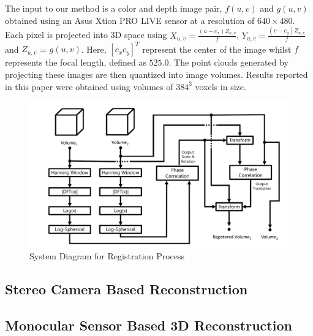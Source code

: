 The input to our method is a color and depth image pair, $f(u,v)$ and $g(u,v)$ obtained using an Asus Xtion PRO LIVE sensor at a resolution of $640 \times 480$. Each pixel is projected into 3D space using $X_{u,v} = \frac{(u - c_x)Z_{u,v}}{f}$, $Y_{u,v} = \frac{(v - c_y)Z_{u,v}}{f}$ and $Z_{u,v}$ = $g(u,v)$. 
Here, $[c_x c_y]^T$ represent the center of the image whilst $f$ represents the focal length, defined as $525.0$. The point clouds generated by projecting these images are then quantized into image volumes. Results reported in this paper were obtained using volumes of $384^3$ voxels in size.
\begin{figure}[t]
\centering
\includegraphics[width=6.0in]{images/ch2/pipeline2}
\caption{System Diagram for Registration Process}
\label{fig:PIPELINE}
\end{figure}


\subsection{Stereo Camera Based Reconstruction}

\subsection{Monocular Sensor Based 3D Reconstruction}